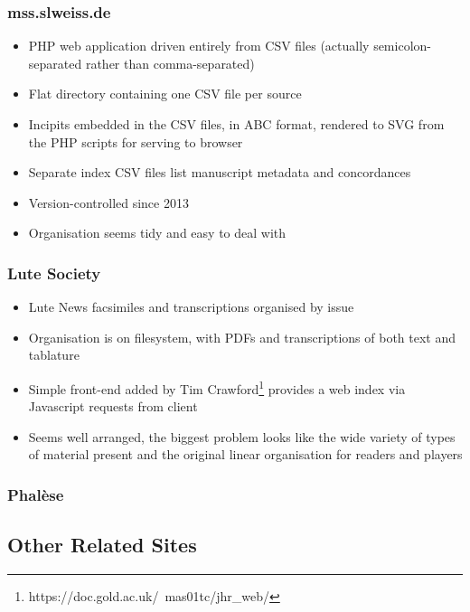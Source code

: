 \documentclass[twocolumn,10pt]{paper}
\begin{document}
\begin{sloppypar}
  \subsubsection{mss.slweiss.de}

  \begin{itemize}
  \item PHP web application driven entirely from CSV files (actually
    semicolon-separated rather than comma-separated)
  \item Flat directory containing one CSV file per source
  \item Incipits embedded in the CSV files, in ABC format, rendered to
    SVG from the PHP scripts for serving to browser
  \item Separate index CSV files list manuscript metadata and
    concordances
  \item Version-controlled since 2013
  \item Organisation seems tidy and easy to deal with
  \end{itemize}
    
  \subsubsection{Lute Society}

  \begin{itemize}
  \item Lute News facsimiles and transcriptions organised by issue
  \item Organisation is on filesystem, with PDFs and transcriptions of
    both text and tablature
  \item Simple front-end added by Tim
    Crawford\footnote{https://doc.gold.ac.uk/~mas01tc/jhr\_web/}
    provides a web index via Javascript requests from client
  \item Seems well arranged, the biggest problem looks like the wide
    variety of types of material present and the original linear
    organisation for readers and players
  \end{itemize}
  
  \subsubsection{Phal\`ese}

  \subsection{Other Related Sites}
  

\end{sloppypar}
\end{document}
